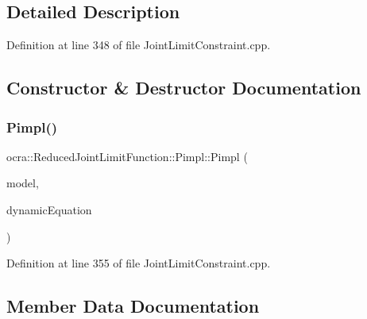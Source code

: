 \subsection{Detailed Description}


Definition at line 348 of file Joint\+Limit\+Constraint.\+cpp.



\subsection{Constructor \& Destructor Documentation}
\hypertarget{structReducedJointLimitFunction_1_1Pimpl_a144b5331a7812ad5859215d57f8fd250}{}\label{structReducedJointLimitFunction_1_1Pimpl_a144b5331a7812ad5859215d57f8fd250} 
\subsubsection{\texorpdfstring{Pimpl()}{Pimpl()}}
{\footnotesize\ttfamily ocra\+::\+Reduced\+Joint\+Limit\+Function\+::\+Pimpl\+::\+Pimpl (\begin{DoxyParamCaption}\item[{const \hyperlink{classocra_1_1Model}{Model} \&}]{model,  }\item[{const \hyperlink{classocra_1_1FullDynamicEquationFunction}{Full\+Dynamic\+Equation\+Function} \&}]{dynamic\+Equation }\end{DoxyParamCaption})\hspace{0.3cm}{\ttfamily [inline]}}



Definition at line 355 of file Joint\+Limit\+Constraint.\+cpp.



\subsection{Member Data Documentation}
\hypertarget{structReducedJointLimitFunction_1_1Pimpl_ad483380d3fcdd2da03a85d22947cf31d}{}\label{structReducedJointLimitFunction_1_1Pimpl_ad483380d3fcdd2da03a85d22947cf31d} 
